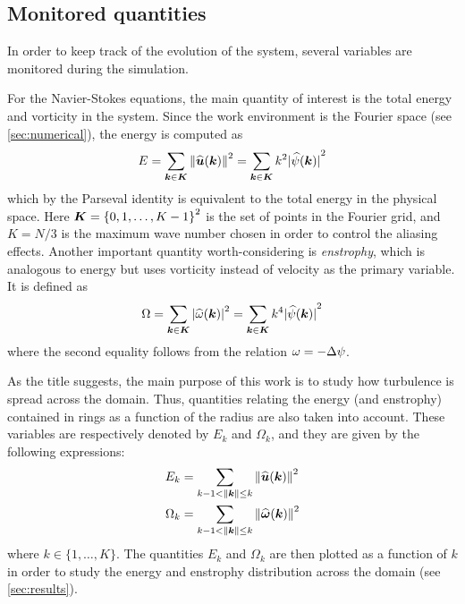 \documentclass[../main.tex]{subfiles}
\begin{document}
\subsection{Monitored quantities}
In order to keep track of the evolution of the system, several variables are monitored during the simulation.

For the Navier-Stokes equations, the main quantity of interest is the total energy and vorticity in the system. Since the work environment is the Fourier space (see \cref{sec:numerical}), the energy is computed as
\begin{equation}
	E = \sum_{\boldsymbol{k}\in\boldsymbol{K}} \left\|\widehat{\boldsymbol{u}}(\boldsymbol{k})\right\|^2 = \sum_{\boldsymbol{k}\in\boldsymbol{K}} k^2 {|\widehat{\psi}(\boldsymbol{k})|}^2
\end{equation}
which by the Parseval identity is equivalent to the total energy in the physical space. Here $\boldsymbol{K} = {\{0,1,\ldots,K-1\}}^2$ is the set of points in the Fourier grid, and $K=N/3$ is the maximum wave number chosen in order to control the aliasing effects. Another important quantity worth-considering is \emph{enstrophy}, which is analogous to energy but uses vorticity instead of velocity as the primary variable. It is defined as
\begin{equation}
	\Omega = \sum_{\boldsymbol{k}\in\boldsymbol{K}} {|\widehat{\omega}(\boldsymbol{k})|}^2 = \sum_{\boldsymbol{k}\in\boldsymbol{K}} k^4 {|\widehat{\psi}(\boldsymbol{k})|}^2
\end{equation}
where the second equality follows from the relation $\omega = -\Delta \psi$.

As the title suggests, the main purpose of this work is to study how turbulence is spread across the domain. Thus, quantities relating the energy (and enstrophy) contained in rings as a function of the radius are also taken into account. These variables are respectively denoted by $E_k$ and $\Omega_k$, and they are given by the following expressions:
\begin{align}
	E_k      & = \sum_{k-1<\left\|\boldsymbol{k}\right\|\leq k} \left\|\widehat{\boldsymbol{u}}(\boldsymbol{k})\right\|^2      \\
	\Omega_k & = \sum_{k-1<\left\|\boldsymbol{k}\right\|\leq k} \left\|\widehat{\boldsymbol{\omega}}(\boldsymbol{k})\right\|^2
\end{align}
where $k\in\{1,\ldots,K\}$. The quantities $E_k$ and $\Omega_k$ are then plotted as a function of $k$ in order to study the energy and enstrophy distribution across the domain (see \cref{sec:results}).
\end{document}
